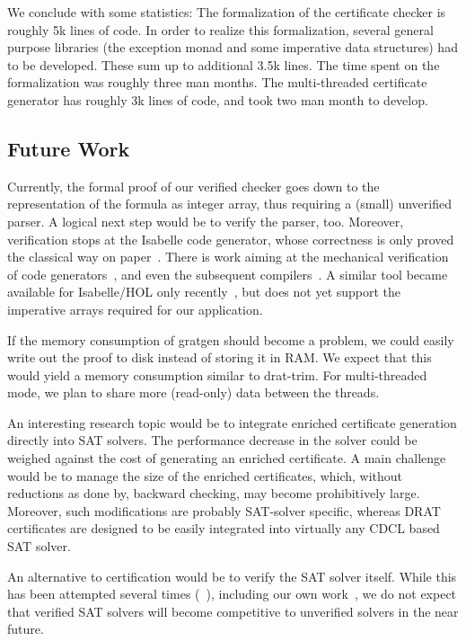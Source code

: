 \documentclass[smallcondensed]{svjour3}     %
\begin{document}
We conclude with some statistics: The formalization of the certificate checker is roughly 5k lines of code.
In order to realize this formalization, several general purpose libraries (\eg the exception monad and some imperative data structures) had to be developed. 
These sum up to additional 3.5k lines. The time spent on the formalization was roughly three man months. The multi-threaded certificate generator has roughly 3k 
lines of code, and took two man month to develop.

\subsection{Future Work}
Currently, the formal proof of our verified checker goes down to the representation of the formula as integer array,
thus requiring a (small) unverified parser. A logical next step would be to verify the parser, too.
Moreover, verification stops at the Isabelle code generator, whose correctness is only proved the classical way on paper~\cite{HaNi10,HKKN13}. 
There is work aiming at the mechanical verification of code generators~\cite{MO14}, and even the subsequent compilers~\cite{KMNO14}.
A similar tool became available for Isabelle/HOL only recently~\cite{HuNi18}, but does not yet support the imperative arrays required for our application.

If the memory consumption of gratgen should become a problem, we could easily write out the proof to disk instead of storing it in RAM. 
We expect that this would yield a memory consumption similar to drat-trim. For multi-threaded mode, we plan to share more (read-only) data between the threads.

An interesting research topic would be to integrate enriched certificate generation directly into SAT solvers. 
The performance decrease in the solver could be weighed against the cost of generating an enriched certificate.
A main challenge would be to manage the size of the enriched certificates, which, without reductions as done by, 
\eg backward checking, may become prohibitively large.
Moreover, such modifications are probably SAT-solver specific, whereas DRAT certificates are designed to be
easily integrated into virtually any CDCL based SAT solver.

An alternative to certification would be to verify the SAT solver itself. While this has been attempted several times (\eg~\cite{Maric10,OSOC12}), 
including our own work~\cite{FBL18}, we do not expect that verified SAT solvers will become competitive to unverified solvers in the near future.
\end{document}

